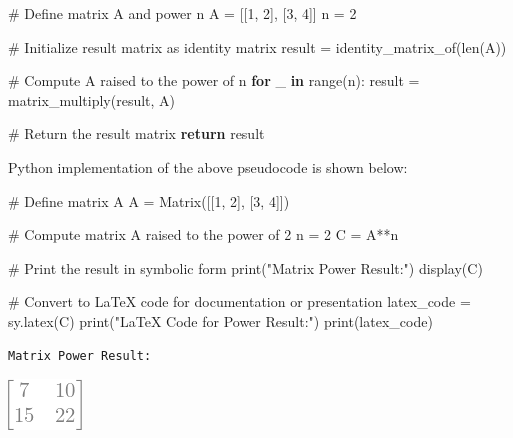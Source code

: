\documentclass[
  letterpaper,
  DIV=11,
  numbers=noendperiod]{scrreprt}
\newenvironment{Shaded}{\begin{snugshade}}{\end{snugshade}}
\newcommand{\BuiltInTok}[1]{\textcolor[rgb]{0.00,0.23,0.31}{#1}}
\newcommand{\CommentTok}[1]{\textcolor[rgb]{0.37,0.37,0.37}{#1}}
\newcommand{\ControlFlowTok}[1]{\textcolor[rgb]{0.00,0.23,0.31}{\textbf{#1}}}
\newcommand{\DecValTok}[1]{\textcolor[rgb]{0.68,0.00,0.00}{#1}}
\newcommand{\KeywordTok}[1]{\textcolor[rgb]{0.00,0.23,0.31}{\textbf{#1}}}
\newcommand{\NormalTok}[1]{\textcolor[rgb]{0.00,0.23,0.31}{#1}}
\newcommand{\OperatorTok}[1]{\textcolor[rgb]{0.37,0.37,0.37}{#1}}
\newcommand{\StringTok}[1]{\textcolor[rgb]{0.13,0.47,0.30}{#1}}
\theoremstyle{plain}
\theoremstyle{definition}
\theoremstyle{remark}
\begin{document}
\begin{Shaded}
\begin{Highlighting}[]
\CommentTok{\# Define matrix A and power n}
\NormalTok{A }\OperatorTok{=}\NormalTok{ [[}\DecValTok{1}\NormalTok{, }\DecValTok{2}\NormalTok{], [}\DecValTok{3}\NormalTok{, }\DecValTok{4}\NormalTok{]]}
\NormalTok{n }\OperatorTok{=} \DecValTok{2}

\CommentTok{\# Initialize result matrix as identity matrix}
\NormalTok{result }\OperatorTok{=}\NormalTok{ identity\_matrix\_of(}\BuiltInTok{len}\NormalTok{(A))}

\CommentTok{\# Compute A raised to the power of n}
\ControlFlowTok{for}\NormalTok{ \_ }\KeywordTok{in} \BuiltInTok{range}\NormalTok{(n):}
\NormalTok{    result }\OperatorTok{=}\NormalTok{ matrix\_multiply(result, A)}

\CommentTok{\# Return the result matrix}
\ControlFlowTok{return}\NormalTok{ result}
\end{Highlighting}
\end{Shaded}

Python implementation of the above pseudocode is shown below:

\begin{Shaded}
\begin{Highlighting}[]
\CommentTok{\# Define matrix A}
\NormalTok{A }\OperatorTok{=}\NormalTok{ Matrix([[}\DecValTok{1}\NormalTok{, }\DecValTok{2}\NormalTok{], [}\DecValTok{3}\NormalTok{, }\DecValTok{4}\NormalTok{]])}

\CommentTok{\# Compute matrix A raised to the power of 2}
\NormalTok{n }\OperatorTok{=} \DecValTok{2}
\NormalTok{C }\OperatorTok{=}\NormalTok{ A}\OperatorTok{**}\NormalTok{n}

\CommentTok{\# Print the result in symbolic form}
\BuiltInTok{print}\NormalTok{(}\StringTok{"Matrix Power Result:"}\NormalTok{)}
\NormalTok{display(C)}

\CommentTok{\# Convert to LaTeX code for documentation or presentation}
\NormalTok{latex\_code }\OperatorTok{=}\NormalTok{ sy.latex(C)}
\BuiltInTok{print}\NormalTok{(}\StringTok{"LaTeX Code for Power Result:"}\NormalTok{)}
\BuiltInTok{print}\NormalTok{(latex\_code)}
\end{Highlighting}
\end{Shaded}

\begin{verbatim}
Matrix Power Result:
\end{verbatim}

\includegraphics{module_1_files/figure-pdf/cell-7-output-2.png}
\end{document}
